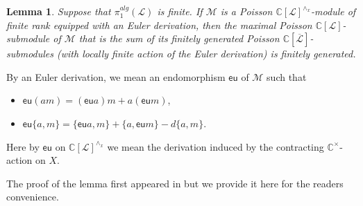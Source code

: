 \documentclass[12pt]{amsart}
\newcommand{\C}{\mathbb{C}}
\newcommand{\Leaf}{\mathcal{L}}
\newtheorem{Lem}[Thm]{Lemma}
\theoremstyle{definition}
\begin{document}
\begin{Lem}
Suppose that $\pi_1^{alg}(\mathcal{L})$ is finite. If $\mathcal{M}$ is a  Poisson $\C[\Leaf]^{\wedge_x}$-module of finite rank equipped with an Euler
derivation, then the maximal Poisson $\C[\Leaf]$-submodule of $\mathcal{M}$ that is the sum of its finitely
generated Poisson $\C[\overline{\Leaf}]$-submodules (with locally finite action of the  Euler derivation) is
finitely generated.
\end{Lem}
By an Euler derivation, we mean an endomorphism $\mathsf{eu}$ of $\mathcal{M}$ such that
\begin{itemize}
\item $\mathsf{eu}(am)=(\mathsf{eu}a)m+a(\mathsf{eu}m)$,
\item $\mathsf{eu}\{a,m\}=\{\mathsf{eu}a, m\}+\{a, \mathsf{eu}m\}-d\{a,m\}$.
\end{itemize}
Here by $\mathsf{eu}$ on $\C[\Leaf]^{\wedge_x}$ we mean the derivation induced by the contracting $\C^\times$-action
on $X$.

The proof of the lemma first appeared in \cite[Proposition 6.1]{Gies} but we provide it here for the readers
convenience.
\end{document}
